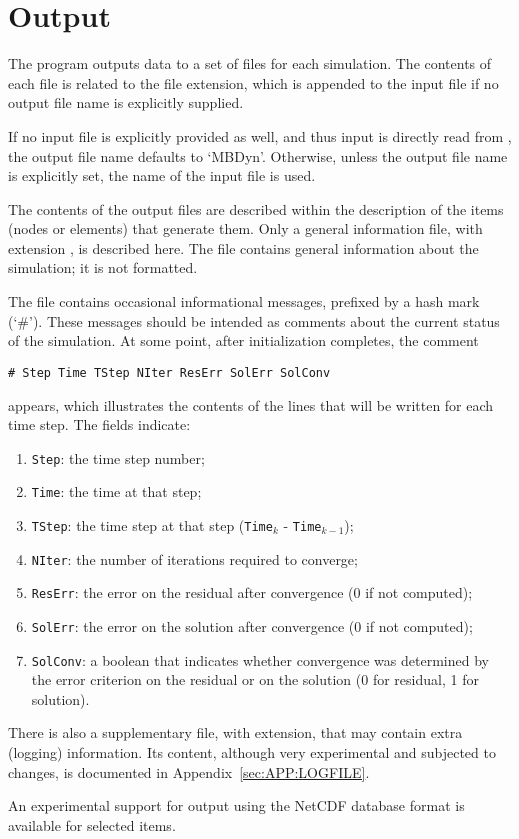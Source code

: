 \section{Output}
The program outputs data to a set of files for each simulation.
The contents of each file is related to the file extension,
which is appended to the input file if no output file name 
is explicitly supplied.

If no input file is explicitly provided as well, and thus input
is directly read from , the output file name defaults
to `MBDyn'.
Otherwise, unless the output file name is explicitly set, the name 
of the input file is used.

The contents of the output files are described within the description
of the items (nodes or elements) that generate them.
Only a general information file, with extension , 
is described here. 
The file contains general information about the simulation; 
it is not formatted. 

The file contains occasional informational messages,
prefixed by a hash mark (`\#').
These messages should be intended as comments about the current status
of the simulation.
At some point, after initialization completes, the comment
\begin{verbatim}
# Step Time TStep NIter ResErr SolErr SolConv
\end{verbatim}
appears, which illustrates the contents of the lines that will be written
for each time step.
The fields indicate:
\begin{enumerate}
\item \texttt{Step}: the time step number;
\item \texttt{Time}: the time at that step;
\item \texttt{TStep}: the time step at that step
	(\texttt{Time}$_k$ - \texttt{Time}$_{k-1}$);
\item \texttt{NIter}: the number of iterations required to converge;
\item \texttt{ResErr}: the error on the residual after convergence
	(0 if not computed);
\item \texttt{SolErr}: the error on the solution after convergence
	(0 if not computed);
\item \texttt{SolConv}: a boolean that indicates whether convergence
	was determined by the error criterion on the residual
	or on the solution (0 for residual, 1 for solution).
\end{enumerate}

There is also a supplementary file, with  extension,
that may contain extra (logging) information.
Its content, although very experimental and subjected to changes,
is documented in Appendix~\ref{sec:APP:LOGFILE}.

\bigskip

An experimental support for output using the NetCDF database format
is available for selected items.

